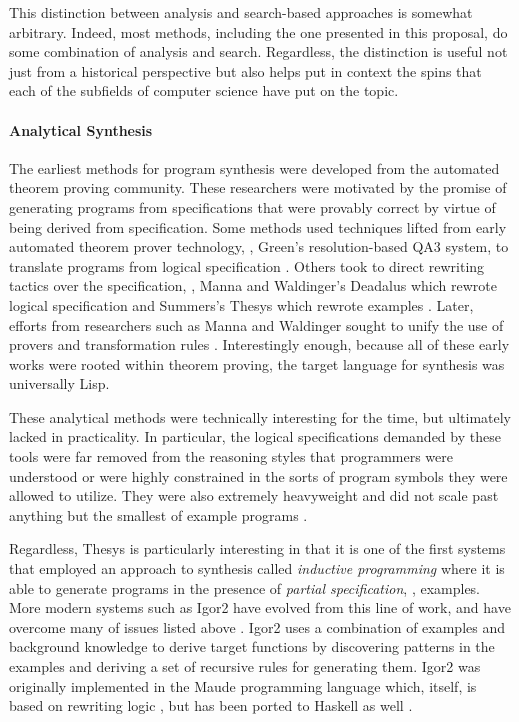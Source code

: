 This distinction between analysis and search-based approaches is somewhat
arbitrary.  Indeed, most methods, including the one presented in this proposal,
do some combination of analysis and search.  Regardless, the distinction is
useful not just from a historical perspective but also helps put in context
the spins that each of the subfields of computer science have put on the
topic.

\paragraph{Analytical Synthesis}
The earliest methods for program synthesis were developed from the automated
theorem proving community.  These researchers were motivated by the promise of
generating programs from specifications that were provably correct by virtue of
being derived from specification.  Some methods used techniques lifted from
early automated theorem prover technology, \eg, Green's resolution-based QA3
system, to translate programs from logical specification
\cite{green-ijcai-1969}.  Others took to direct rewriting tactics over the
specification, \eg, Manna and Waldinger's Deadalus which rewrote logical
specification \cite{manna-tse-1979} and Summers's Thesys which rewrote examples
\cite{summers-popl-1976}.  Later, efforts from researchers such as Manna and
Waldinger sought to unify the use of provers and transformation rules
\cite{manna-plas-1980}.  Interestingly enough, because all of these early works
were rooted within theorem proving, the target language for synthesis was
universally Lisp.

These analytical methods were technically interesting for the time, but
ultimately lacked in practicality.  In particular, the logical specifications
demanded by these tools were far removed from the reasoning styles that
programmers were understood or were highly constrained in the sorts of program
symbols they were allowed to utilize.  They were also extremely heavyweight and
did not scale past anything but the smallest of example programs
\cite{kreitz-automated-deduction-1998}.

Regardless, Thesys is particularly interesting in that it is one of the first
systems that employed an approach to synthesis called \emph{inductive
programming} \cite{kitzelmann-aaip-2010} where it is able to generate programs
in the presence of \emph{partial specification}, \eg, examples.  More modern
systems such as Igor2 have evolved from this line of work, and have overcome
many of issues listed above \cite{kitzelmann-thesis-2010}.  Igor2 uses a
combination of examples and background knowledge to derive target functions by
discovering patterns in the examples and deriving a set of recursive rules for
generating them.  Igor2 was originally implemented in the Maude programming
language which, itself, is based on rewriting logic \cite{clavel-wrla-2000}, but
has been ported to Haskell as well \cite{hofmann-aaip-2010}.

